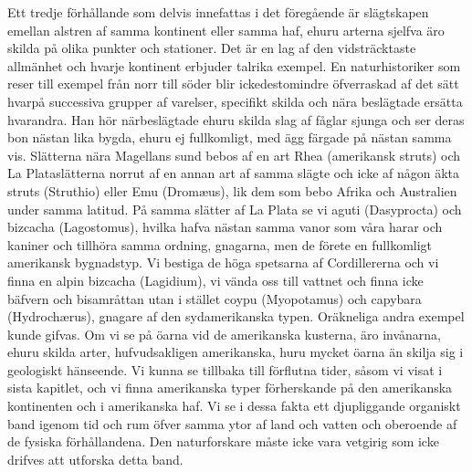 Ett tredje förhållande som delvis innefattas i det föregående är slägtskapen emellan alstren af samma kontinent eller samma haf, ehuru arterna sjelfva äro skilda på olika punkter och stationer. Det är en lag af den vidsträcktaste allmänhet och hvarje kontinent erbjuder talrika exempel. En naturhistoriker som reser till exempel från norr till söder blir ickedestomindre öfverraskad af det sätt hvarpå successiva grupper af varelser, specifikt skilda och nära beslägtade ersätta hvarandra. Han hör närbeslägtade ehuru skilda slag af fåglar sjunga och ser deras bon nästan lika bygda, ehuru ej fullkomligt, med ägg färgade på nästan samma vis. Slätterna nära Magellans sund bebos af en art Rhea (amerikansk struts) och La Plataslätterna norrut af en annan art af samma slägte och icke af någon äkta struts (Struthio) eller Emu (Dromæus), lik dem som bebo Afrika och Australien under samma latitud. På samma slätter af La Plata se vi aguti (Dasyprocta) och bizcacha (Lagostomus), hvilka hafva nästan samma vanor som våra harar och kaniner och tillhöra samma ordning, gnagarna, men de förete en fullkomligt amerikansk bygnadstyp. Vi bestiga de höga spetsarna af Cordillererna och vi finna en alpin bizcacha (Lagidium), vi vända oss till vattnet och finna icke bäfvern och bisamråttan utan i stället coypu (Myopotamus) och capybara (Hydrochærus), gnagare af den sydamerikanska typen. Oräkneliga andra exempel kunde gifvas. Om vi se på öarna vid de amerikanska kusterna, äro invånarna, ehuru skilda arter, hufvudsakligen amerikanska, huru mycket öarna än skilja sig i geologiskt hänseende. Vi kunna se tillbaka till förflutna tider, såsom vi visat i sista kapitlet, och vi finna amerikanska typer förherskande på den amerikanska kontinenten och i amerikanska haf. Vi se i dessa fakta ett djupliggande organiskt band igenom tid och rum öfver samma ytor af land och vatten och oberoende af de fysiska förhållandena. Den naturforskare måste icke vara vetgirig som icke drifves att utforska detta band.

